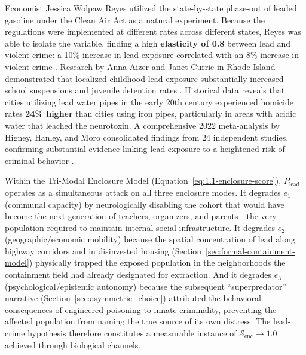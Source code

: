 Economist Jessica Wolpaw Reyes utilized the state-by-state phase-out of leaded gasoline under the Clean Air Act as a natural experiment. Because the regulations were implemented at different rates across different states, Reyes was able to isolate the variable, finding a high \textbf{elasticity of 0.8} between lead and violent crime: a 10\% increase in lead exposure correlated with an 8\% increase in violent crime \cite{reyes2007}. Research by Anna Aizer and Janet Currie in Rhode Island demonstrated that localized childhood lead exposure substantially increased school suspensions and juvenile detention rates \cite{aizer_currie}. Historical data reveals that cities utilizing lead water pipes in the early 20th century experienced homicide rates \textbf{24\% higher} than cities using iron pipes, particularly in areas with acidic water that leached the neurotoxin. A comprehensive 2022 meta-analysis by Higney, Hanley, and Moro consolidated findings from 24 independent studies, confirming substantial evidence linking lead exposure to a heightened risk of criminal behavior \cite{higney2022}.

Within the Tri-Modal Enclosure Model (Equation~\ref{eq:1.1-enclosure-score}), \(P_{\text{lead}}\) operates as a simultaneous attack on all three enclosure modes. It degrades \(e_1\) (communal capacity) by neurologically disabling the cohort that would have become the next generation of teachers, organizers, and parents---the very population required to maintain internal social infrastructure. It degrades \(e_2\) (geographic/economic mobility) because the spatial concentration of lead along highway corridors and in disinvested housing (Section~\ref{sec:formal-containment-model}) physically trapped the exposed population in the neighborhoods the containment field had already designated for extraction. And it degrades \(e_3\) (psychological/epistemic autonomy) because the subsequent ``superpredator'' narrative (Section~\ref{sec:asymmetric_choice}) attributed the behavioral consequences of engineered poisoning to innate criminality, preventing the affected population from naming the true source of its own distress. The lead-crime hypothesis therefore constitutes a measurable instance of $\mathcal{S}_{\text{enc}} \to 1.0$ achieved through biological channels.

